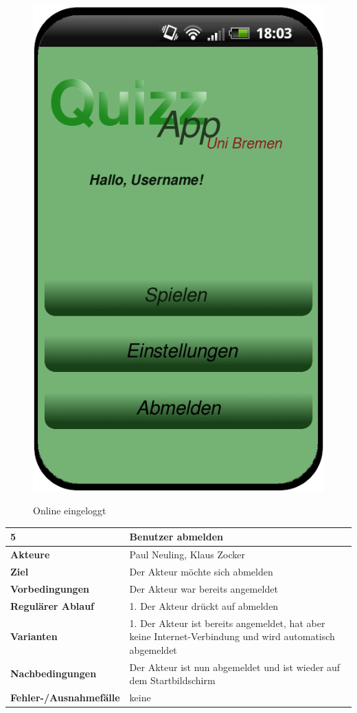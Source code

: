 \documentclass[fontsize=12pt,paper=a4,twoside]{scrartcl}
\begin{document}
\begin{figure}
	[H] \caption{Online eingeloggt} 
	\includegraphics[width=0.5
	\textwidth]{Bilder/QuizzLoginSuccessfullyONLINE.png} \label{pic:Startseite} 
\end{figure}

\begin{table}
	[H] \label{5} 
	\begin{tabular}
		{|l|p{10cm}|} \hline \textbf{5} & \textbf{Benutzer abmelden} \\
		\hline \textbf{Akteure} & Paul Neuling, Klaus Zocker\\
		\hline \textbf{Ziel} & Der Akteur möchte sich abmelden\\
		\hline \textbf{Vorbedingungen} & Der Akteur war bereits angemeldet \\
		\hline \textbf{Regulärer Ablauf} & 1. Der Akteur drückt auf abmelden \\
		\hline \textbf{Varianten} & 1. Der Akteur ist bereits angemeldet, hat aber keine Internet-Verbindung und wird automatisch abgemeldet \\
		\hline \textbf{Nachbedingungen} & Der Akteur ist nun abgemeldet und ist wieder auf dem Startbildschirm\\
		\hline \textbf{Fehler-/Ausnahmefälle} & keine \\
		\hline 
	\end{tabular}
\end{table}
\end{document}
